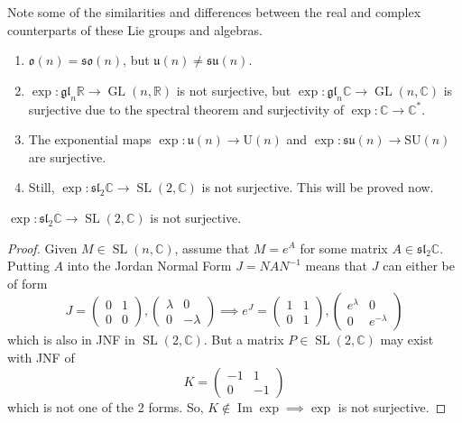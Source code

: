 \documentclass{article}
\DeclareMathOperator{\im}{Im}
\DeclareMathOperator{\GL}{GL}
\DeclareMathOperator{\SL}{SL}
\newcounter{theorem}[section]
\begin{document}
    Note some of the similarities and differences between the real and complex counterparts of these Lie groups and algebras. 
    \begin{enumerate}
      \item $\mathfrak{o}(n) = \mathfrak{so}(n)$, but $\mathfrak{u}(n) \neq \mathfrak{su}(n)$. 
      \item $\exp: \mathfrak{gl}_n \mathbb{R} \rightarrow \GL(n, \mathbb{R})$ is not surjective, but $\exp: \mathfrak{gl}_n \mathbb{C} \rightarrow \GL(n, \mathbb{C})$ is surjective due to the spectral theorem and surjectivity of $\exp: \mathbb{C} \rightarrow \mathbb{C}^*$.
      \item The exponential maps $\exp: \mathfrak{u}(n) \rightarrow \text{U}(n)$ and $\exp: \mathfrak{su}(n) \rightarrow \text{SU}(n)$ are surjective. 
      \item Still, $\exp: \mathfrak{sl}_2 \mathbb{C} \rightarrow \SL(2, \mathbb{C})$ is not surjective. This will be proved now. 
    \end{enumerate}

    \begin{theorem}
      \label{thm:non-surjectivity-of-exp-on-mathfraksl2c}
      $\exp: \mathfrak{sl}_2 \mathbb{C} \rightarrow \SL(2, \mathbb{C})$ is not surjective. 
    \end{theorem}
    \begin{proof}
      Given $M \in \SL(n, \mathbb{C})$, assume that $M = e^A$ for some matrix $A \in \mathfrak{sl}_2 \mathbb{C}$. Putting $A$ into the Jordan Normal Form $J = N A N^{-1}$ means that $J$ can either be of form
      \begin{equation}
        J = \begin{pmatrix}
        0&1\\0&0
        \end{pmatrix}, \begin{pmatrix}
        \lambda&0\\0&-\lambda
        \end{pmatrix} \implies e^J = \begin{pmatrix}
        1&1\\0&1
        \end{pmatrix}, \begin{pmatrix}
        e^\lambda&0\\0&e^{-\lambda}
        \end{pmatrix}
      \end{equation}
      which is also in JNF in $\SL(2, \mathbb{C})$. But a matrix $P \in \SL(2, \mathbb{C})$ may exist with JNF of 
      \begin{equation}
        K = \begin{pmatrix}
        -1&1\\0&-1
        \end{pmatrix}
      \end{equation}
      which is not one of the 2 forms. So, $K \not\in \im{\exp} \implies \exp$ is not surjective. 
    \end{proof}
\end{document}
